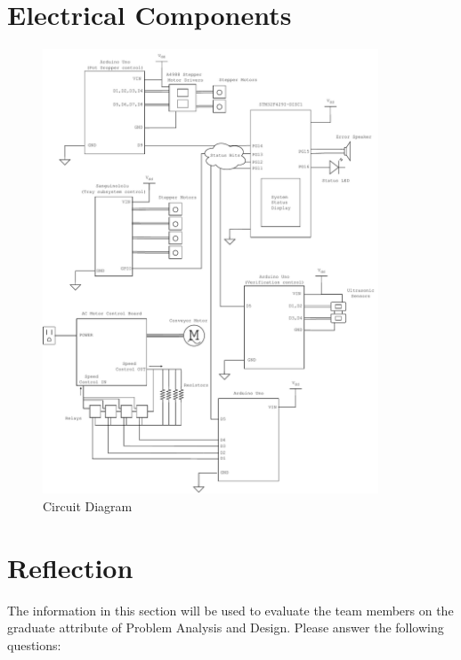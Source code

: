 \documentclass[12pt, titlepage]{article}
\begin{document}
\section{Electrical Components}

\begin{figure}[H]
  \centering
  \includegraphics[width=0.89\textwidth]{circuit_diagram.pdf}
  \caption{Circuit Diagram}
  \label{fig:circuit}
\end{figure}

\section{Reflection}

The information in this section will be used to evaluate the team members on the
graduate attribute of Problem Analysis and Design.  Please answer the following questions:
\end{document}
